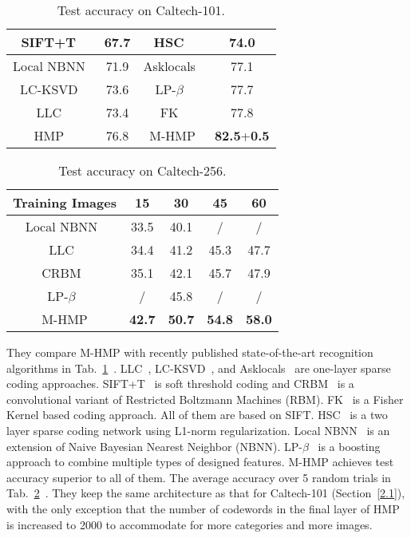 \documentclass[10pt,twocolumn,letterpaper]{article}
\begin{document}
\begin{table}
\begin{center}
\begin{tabular}{|c|c|c|c|}
  \hline
  SIFT+T~\cite{importance} & 67.7 & HSC~\cite{image} & 74.0 \\ \hline
  Local NBNN~\cite{Local} & 71.9 & Asklocals~\cite{Ask} & 77.1 \\ \hline
  LC-KSVD~\cite{Learning} & 73.6 & LP-$\beta$~\cite{On} & 77.7 \\ \hline
  LLC~\cite{constrained} & 73.4 & FK~\cite{The} & 77.8 \\ \hline
  HMP~\cite{Hierarchical} & 76.8 & M-HMP & {\bf 82.5}+{\bf 0.5} \\
  \hline
\end{tabular}
\end{center}
\caption{Test accuracy on Caltech-101.}
\label{tab1}
\end{table}

\begin{table}
\begin{center}
\begin{tabular}{|c|c|c|c|c|}
  \hline
  Training Images & 15 & 30 & 45 & 60 \\ \hline
  Local NBNN~\cite{Local} & 33.5 & 40.1 & / & / \\ \hline
  LLC~\cite{constrained} & 34.4 & 41.2 & 45.3 & 47.7 \\ \hline
  CRBM~\cite{Efficient} & 35.1 & 42.1 & 45.7 & 47.9 \\ \hline
  LP-$\beta$~\cite{On} & / & 45.8 & / & / \\ \hline
  M-HMP & {\bf 42.7} & {\bf 50.7} & {\bf 54.8} & {\bf 58.0} \\ 
  \hline
\end{tabular}
\end{center}
\caption{Test accuracy on Caltech-256.}
\label{tab2}
\end{table}


They compare M-HMP with recently published state-of-the-art recognition algorithms in Tab.~\ref{tab1}~\cite{multipath}. LLC~\cite{constrained}, LC-KSVD~\cite{Learning}, and Asklocals~\cite{Ask} are one-layer sparse coding approaches. SIFT+T~\cite{importance} is soft threshold coding and CRBM~\cite{Efficient} is a convolutional variant of Restricted Boltzmann Machines (RBM). FK~\cite{The} is a Fisher Kernel based coding approach. All of them are based on SIFT. HSC~\cite{image} is a two layer sparse coding network using L1-norm regularization. Local NBNN~\cite{Local} is an extension of Naive Bayesian Nearest Neighbor (NBNN). LP-$\beta$~\cite{On} is a boosting approach to combine multiple types of designed features. M-HMP achieves test accuracy superior to all of them. The average accuracy over 5 random trials in Tab.~\ref{tab2}~\cite{multipath}. They keep the same architecture as that for Caltech-101 (Section~\ref{2.1}), with the only exception that the number of codewords in the final layer of HMP is increased to 2000 to accommodate for more categories and more images.

{\small


}
\end{document}
